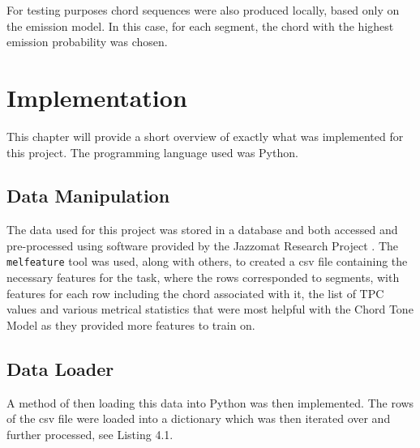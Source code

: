 \documentclass[bsc,singlespacing,parskip,deptreport,twoside,frontabs]{infthesis}
\begin{document}
For testing purposes chord sequences were also produced locally, based only on the emission model. In this case, for each segment, the chord with the highest emission probability was chosen.

\chapter{Implementation}

This chapter will provide a short overview of exactly what was implemented for this project. The programming language used was Python.

\section{Data Manipulation}

The data used for this project was stored in a database and both accessed and pre-processed using software provided by the Jazzomat Research Project \cite[]{mel}. The {\tt melfeature} tool was used, along with others, to created a csv file containing the necessary features for the task, where the rows corresponded to segments, with features for each row including the chord associated with it, the list of TPC values and various metrical statistics that were most helpful with the Chord Tone Model as they provided more features to train on.

\section{Data Loader}

A method of then loading this data into Python was then implemented. The rows of the csv file were loaded into a dictionary which was then iterated over and further processed, see Listing 4.1.
\end{document}
